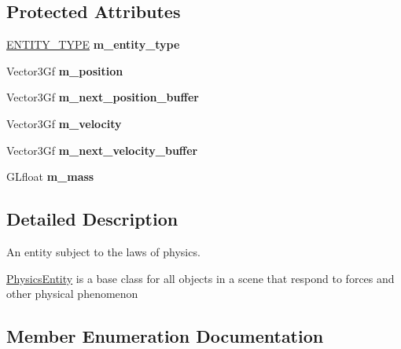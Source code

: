 \subsection*{Protected Attributes}
\begin{DoxyCompactItemize}
\item 
\mbox{\label{classPhysicsEntity_a71e8887fb5fd67e84b39d99dae634daf}} 
\hyperlink{classPhysicsEntity_a171840d3fef1fc21c3f922b240e03538}{E\+N\+T\+I\+T\+Y\+\_\+\+T\+Y\+PE} {\bfseries m\+\_\+entity\+\_\+type}
\item 
\mbox{\label{classPhysicsEntity_afee5026bb0c5504697b7a6c4c59d8003}} 
Vector3\+Gf {\bfseries m\+\_\+position}
\item 
\mbox{\label{classPhysicsEntity_abc38c58fd803d67079f25043331f0018}} 
Vector3\+Gf {\bfseries m\+\_\+next\+\_\+position\+\_\+buffer}
\item 
\mbox{\label{classPhysicsEntity_ad03f63872ec7c9ddf734e92034d6e112}} 
Vector3\+Gf {\bfseries m\+\_\+velocity}
\item 
\mbox{\label{classPhysicsEntity_a00034d95cc1a6f34ceaf5ad961e4afe6}} 
Vector3\+Gf {\bfseries m\+\_\+next\+\_\+velocity\+\_\+buffer}
\item 
\mbox{\label{classPhysicsEntity_a5a7bc5174169e169f69723d2483c2eff}} 
G\+Lfloat {\bfseries m\+\_\+mass}
\end{DoxyCompactItemize}


\subsection{Detailed Description}
An entity subject to the laws of physics. 

\hyperlink{classPhysicsEntity}{Physics\+Entity} is a base class for all objects in a scene that respond to forces and other physical phenomenon 

\subsection{Member Enumeration Documentation}
\mbox{\label{classPhysicsEntity_a171840d3fef1fc21c3f922b240e03538}} 
